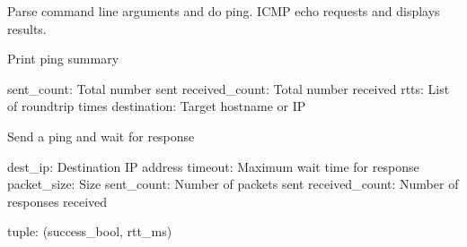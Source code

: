 \documentclass[letterpaper,10pt,english]{sphinxmanual}
\begin{document}

\begin{fulllineitems}
\label{\detokenize{my_ping:my_ping.main}}
\pysigstartsignatures
\pysiglinewithargsret
{}
{}
{}
\pysigstopsignatures
\sphinxAtStartPar
Parse command line arguments and do ping.
ICMP echo requests and displays results.

\end{fulllineitems}


\begin{fulllineitems}
\label{\detokenize{my_ping:my_ping.print_stats}}
\pysigstartsignatures
\pysiglinewithargsret
{}
{\sphinxparamcomma {}\sphinxparamcomma {}\sphinxparamcomma {}}
{}
\pysigstopsignatures
\sphinxAtStartPar
Print ping summary
\begin{description}
\sphinxAtStartPar
sent\_count: Total number sent
received\_count: Total number received
rtts: List of round\sphinxhyphen{}trip times
destination: Target hostname or IP

\end{description}

\end{fulllineitems}


\begin{fulllineitems}
\label{\detokenize{my_ping:my_ping.send_ping}}
\pysigstartsignatures
\pysiglinewithargsret
{}
{\sphinxparamcomma {}\sphinxparamcomma {}\sphinxparamcomma {}\sphinxparamcomma {}}
{}
\pysigstopsignatures
\sphinxAtStartPar
Send a ping and wait for response
\begin{description}
\sphinxAtStartPar
dest\_ip: Destination IP address
timeout: Maximum wait time for response
packet\_size: Size
sent\_count: Number of packets sent
received\_count: Number of responses received

\sphinxAtStartPar
tuple: (success\_bool, rtt\_ms)

\end{description}

\end{fulllineitems}
\end{document}
